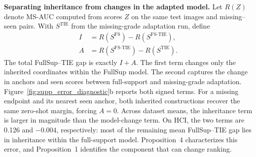 \noindent\textbf{Separating inheritance from changes in the adapted model.}
Let $R(Z)$ denote MS-AUC computed from scores $Z$ on the same test images and missing--seen pairs.
With $S^{\mathrm{TIE}}$ from the missing-grade adaptation run, define
\begin{equation}
\begin{aligned}
I
&=R(S^{\mathrm{FS}})
 -R(S^{\mathrm{FS\text{-}TIE}}),\\
A
&=R(S^{\mathrm{FS\text{-}TIE}})
 -R(S^{\mathrm{TIE}}).
\end{aligned}
\label{eq:supp_fullsupport_gaps}
\end{equation}
The total FullSup--TIE gap is exactly $I+A$.
The first term changes only the inherited coordinates within the FullSup model.
The second captures the change in anchors and seen scores between full-support and missing-grade adaptation.
Figure~\ref{fig:supp_error_diagnostic}b reports both signed terms.
For a missing endpoint and its nearest seen anchor, both inherited constructions recover the same zero-shot margin, forcing $A=0$.
Across dataset means, the inheritance term is larger in magnitude than the model-change term.
On HCI, the two terms are 0.126 and $-0.004$, respectively: most of the remaining mean FullSup--TIE gap lies in inheritance within the full-support model.
Proposition~4 characterizes this error, and Proposition~1 identifies the component that can change ranking.
